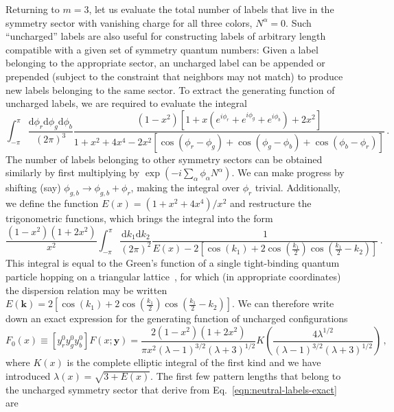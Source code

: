 Returning to $m=3$, let us evaluate the total number of labels that live in the symmetry sector with vanishing charge for all three colors, $N^\alpha = 0$.
Such ``uncharged'' labels are also useful for constructing labels of arbitrary length compatible with a given set of symmetry quantum numbers: Given a label belonging to the appropriate sector, an uncharged label can be appended or prepended (subject to the constraint that neighbors may not match) to produce new labels belonging to the same sector.
To extract the generating function of uncharged labels, we are required to evaluate the integral
%
%
\begin{equation}
    \int_{-\pi}^{\pi} \frac{\mathrm{d}\phi_r \mathrm{d}\phi_g \mathrm{d}\phi_b}{(2\pi)^3}  \frac{\left(1-x^2\right) \left[ 1 + x (e^{i\phi_r}+e^{i\phi_g}+e^{i\phi_b})+2x^2\right]}{1+x^2+4 x^4  - 2x^2 \left[\cos(\phi_r - \phi_g)+\cos(\phi_g - \phi_b) + \cos(\phi_b - \phi_r)\right]}
    \, .
\end{equation}
%
%
The number of labels belonging to other symmetry sectors can be obtained similarly by first multiplying by $\exp(-i \sum_\alpha \phi_\alpha N^\alpha )$.
We can make progress by shifting (say) $\phi_{g,b} \to \phi_{g,b} + \phi_r$, making the integral over $\phi_r$ trivial. Additionally, we define the function $E(x) = (1+x^2+4x^4)/x^2$ and restructure the trigonometric functions, which brings the integral into the form
%
%
\begin{equation}
    \frac{\left(1-x^2\right) ( 1+2x^2)}{x^2}\int_{-\pi}^{\pi} \frac{ \mathrm{d}k_1 \mathrm{d}k_2}{(2\pi)^2}  \frac{1}{E(x) - 2\left[\cos( k_1) + 2 \cos(\frac{k_1}{2})\cos(\frac{k_1}{2}-k_2)\right]}
    \, .
 \end{equation}
%
%
This integral is equal to the Green's function of a single tight-binding quantum particle hopping on a triangular lattice~\cite{Horiguchi1972Lattice}, for which (in appropriate coordinates) the dispersion relation may be written $E(\mathbf{k}) = 2\left[\cos( k_1) + 2 \cos(\frac{k_1}{2})\cos(\frac{k_1}{2}-k_2)\right]$. We can therefore write down an exact expression for the generating function of uncharged configurations
%
%
\begin{equation}
    F_0(x) \equiv [y_r^0 y_g^0 y_b^0]F(x; \mathbf{y}) = \frac{2\left(1-x^2\right) ( 1+2x^2)}{\pi x^2 (\lambda-1)^{3/2} (\lambda+3)^{1/2}}  K\left( \frac{4\lambda^{1/2}}{(\lambda-1)^{3/2} (\lambda+3)^{1/2}} \right) 
    \, ,
    \label{eqn:neutral-labels-exact}
\end{equation}
%
%
where $K(x)$ is the complete elliptic integral of the first kind and we have introduced $\lambda(x) = \sqrt{3+E(x)}$. The first few pattern lengths that belong to the uncharged symmetry sector that derive from Eq.~\eqref{eqn:neutral-labels-exact} are
